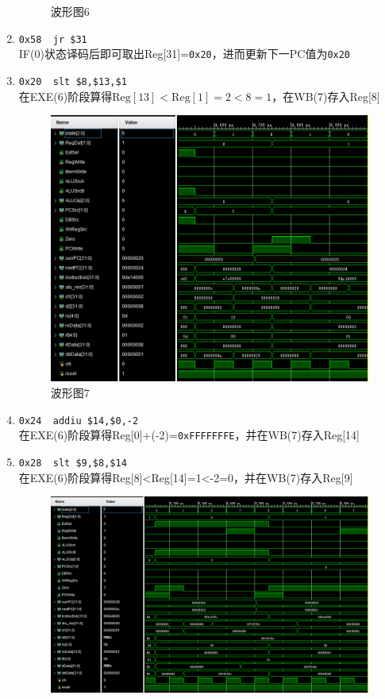\begin{enumerate}
\begin{figure}[H]
\caption{波形图6}
\label{fig:wave_6}
\end{figure}
    \item \verb'0x58  jr $31'\\
    IF(0)状态译码后即可取出Reg[31]=\verb'0x20'，进而更新下一PC值为\verb'0x20'
    \item \verb'0x20  slt $8,$13,$1'\\
    在EXE(6)阶段算得$\mathrm{Reg}[13]<\mathrm{Reg}[1]=2<8=1$，在WB(7)存入Reg[8]
\begin{figure}[H]
\centering
\includegraphics[width=0.9\linewidth]{fig/FullIns/Ins7.PNG}
\caption{波形图7}
\label{fig:wave_7}
\end{figure}
    \item \verb'0x24  addiu $14,$0,-2'\\
    在EXE(6)阶段算得Reg[0]+(-2)=\verb'0xFFFFFFFE'，并在WB(7)存入Reg[14]
    \item \verb'0x28  slt $9,$8,$14'\\
    在EXE(6)阶段算得Reg[8]<Reg[14]=1<-2=0，并在WB(7)存入Reg[9]
\begin{figure}[H]
\centering
\includegraphics[width=0.9\linewidth]{fig/FullIns/Ins8.PNG}

\end{figure}
\end{enumerate}
